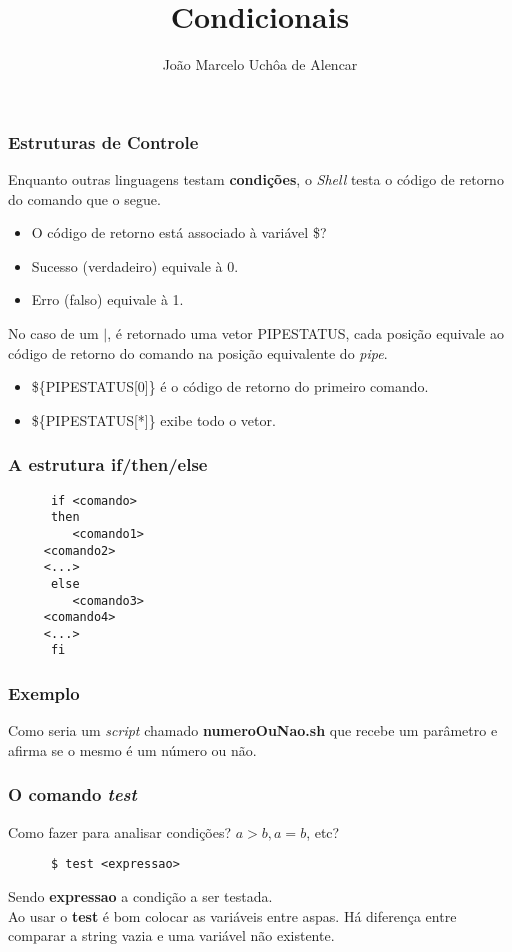 \documentclass{beamer}
\title{Condicionais}
\author[João Marcelo Uchôa de Alencar]{João Marcelo Uchôa de Alencar}
\institute{Universidade Federal do Ceará - Quixadá}
\begin{document}
   \begin{frame}
      \titlepage
   \end{frame}

   \begin{frame}
      \frametitle{Estruturas de Controle}
      Enquanto outras linguagens testam \textbf{condições}, o \textit{Shell} testa o código de retorno do comando que o segue. \\
      \begin{itemize}
         \item O código de retorno está associado à variável \$?
	 \item Sucesso (verdadeiro) equivale à 0.
	 \item Erro (falso) equivale à 1.
      \end{itemize}
      No caso de um $|$, é retornado uma vetor PIPESTATUS, cada posição equivale ao código de retorno do comando na posição equivalente do \textit{pipe}.
      \begin{itemize}
         \item \$\{PIPESTATUS[0]\} é o código de retorno do primeiro comando.
	 \item \$\{PIPESTATUS[*]\} exibe todo o vetor.
      \end{itemize}
   \end{frame}

   \begin{frame}[fragile]
      \frametitle{A estrutura if\slash then\slash else}
      \begin{verbatim}
      if <comando>
      then
         <comando1>
	 <comando2>
	 <...>
      else
         <comando3>
	 <comando4>
	 <...>
      fi
      \end{verbatim}
\end{frame}

   \begin{frame}
      \frametitle{Exemplo}
      Como seria um \textit{script} chamado \textbf{numeroOuNao.sh} que recebe um parâmetro e afirma se o mesmo é um número ou não.
   \end{frame}

   \begin{frame}[fragile]
      \frametitle{O comando \textit{test}}
      Como fazer para analisar condições? $a > b , a = b$, etc?
      \begin{verbatim}
      $ test <expressao>
      \end{verbatim}
      Sendo \textbf{expressao} a condição a ser testada. \\
      Ao usar o \textbf{test} é bom colocar as variáveis entre aspas. Há diferença entre comparar a string vazia e uma variável não existente.
\end{frame}
\end{document}
